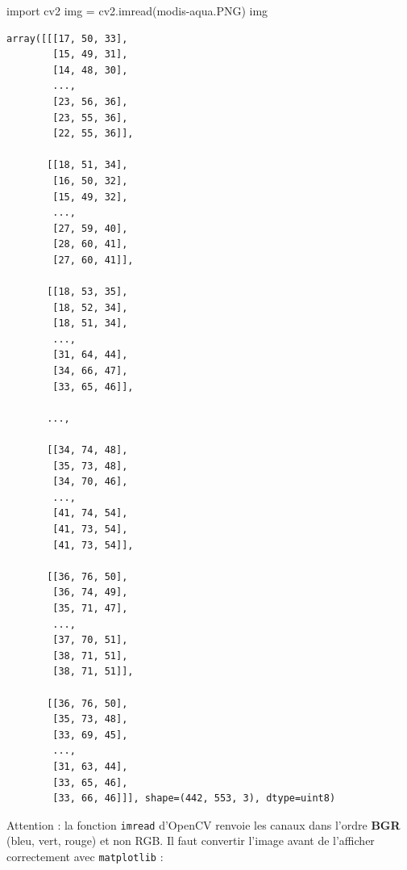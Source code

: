 \documentclass[
  french,
  11pt,
  letterpaper,
  open=any,
  twoside=false,
  french]{scrbook}
\newenvironment{Shaded}{\begin{snugshade}}{\end{snugshade}}
\newcommand{\ImportTok}[1]{\textcolor[rgb]{0.00,0.46,0.62}{#1}}
\newcommand{\NormalTok}[1]{\textcolor[rgb]{0.00,0.23,0.31}{#1}}
\newcommand{\OperatorTok}[1]{\textcolor[rgb]{0.37,0.37,0.37}{#1}}
\newcommand{\StringTok}[1]{\textcolor[rgb]{0.13,0.47,0.30}{#1}}
\begin{document}
\begin{Shaded}
\begin{Highlighting}[]
\ImportTok{import}\NormalTok{ cv2}
\NormalTok{img }\OperatorTok{=}\NormalTok{ cv2.imread(}\StringTok{\textquotesingle{}modis{-}aqua.PNG\textquotesingle{}}\NormalTok{)}
\NormalTok{img}
\end{Highlighting}
\end{Shaded}

\begin{verbatim}
array([[[17, 50, 33],
        [15, 49, 31],
        [14, 48, 30],
        ...,
        [23, 56, 36],
        [23, 55, 36],
        [22, 55, 36]],

       [[18, 51, 34],
        [16, 50, 32],
        [15, 49, 32],
        ...,
        [27, 59, 40],
        [28, 60, 41],
        [27, 60, 41]],

       [[18, 53, 35],
        [18, 52, 34],
        [18, 51, 34],
        ...,
        [31, 64, 44],
        [34, 66, 47],
        [33, 65, 46]],

       ...,

       [[34, 74, 48],
        [35, 73, 48],
        [34, 70, 46],
        ...,
        [41, 74, 54],
        [41, 73, 54],
        [41, 73, 54]],

       [[36, 76, 50],
        [36, 74, 49],
        [35, 71, 47],
        ...,
        [37, 70, 51],
        [38, 71, 51],
        [38, 71, 51]],

       [[36, 76, 50],
        [35, 73, 48],
        [33, 69, 45],
        ...,
        [31, 63, 44],
        [33, 65, 46],
        [33, 66, 46]]], shape=(442, 553, 3), dtype=uint8)
\end{verbatim}

Attention : la fonction \texttt{imread} d'OpenCV renvoie les canaux dans
l'ordre \textbf{BGR} (bleu, vert, rouge) et non RGB. Il faut convertir
l'image avant de l'afficher correctement avec \texttt{matplotlib} :
\end{document}
